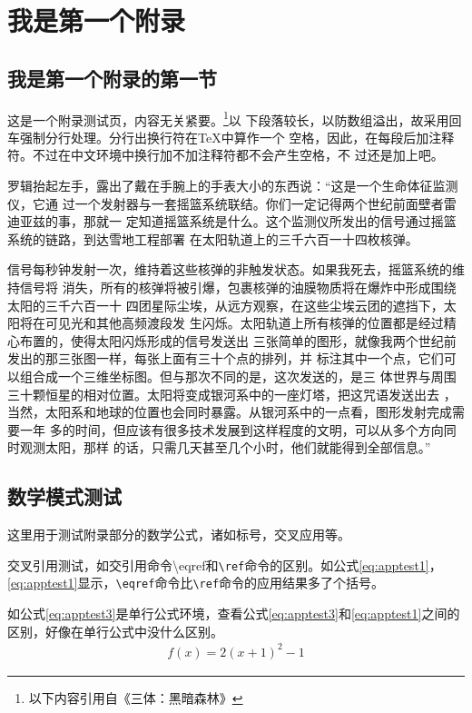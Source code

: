 \chapter{我是第一个附录}
\section{我是第一个附录的第一节}
这是一个附录测试页，内容无关紧要。\footnote{以下内容引用自《三体：黑暗森林》}以%
下段落较长，以防数组溢出，故采用回车强制分行处理。分行出换行符在\TeX 中算作一个%
空格，因此，在每段后加注释符。不过在中文环境中换行加不加注释符都不会产生空格，不%
过还是加上吧。

罗辑抬起左手，露出了戴在手腕上的手表大小的东西说：“这是一个生命体征监测仪，它通%
过一个发射器与一套摇篮系统联结。你们一定记得两个世纪前面壁者雷迪亚兹的事，那就一%
定知道摇篮系统是什么。这个监测仪所发出的信号通过摇篮系统的链路，到达雪地工程部署%
在太阳轨道上的三千六百一十四枚核弹。

信号每秒钟发射一次，维持着这些核弹的非触发状态。如果我死去，摇篮系统的维持信号将%
消失，所有的核弹将被引爆，包裹核弹的油膜物质将在爆炸中形成围绕太阳的三千六百一十%
四团星际尘埃，从远方观察，在这些尘埃云团的遮挡下，太阳将在可见光和其他高频渡段发%
生闪烁。太阳轨道上所有核弹的位置都是经过精心布置的，使得太阳闪烁形成的信号发送出%
三张简单的图形，就像我两个世纪前发出的那三张图一样，每张上面有三十个点的排列，并%
标注其中一个点，它们可以组合成一个三维坐标图。但与那次不同的是，这次发送的，是三%
体世界与周围三十颗恒星的相对位置。太阳将变成银河系中的一座灯塔，把这咒语发送出去%
，当然，太阳系和地球的位置也会同时暴露。从银河系中的一点看，图形发射完成需要一年%
多的时间，但应该有很多技术发展到这样程度的文明，可以从多个方向同时观测太阳，那样%
的话，只需几天甚至几个小时，他们就能得到全部信息。”

\section{数学模式测试}
这里用于测试附录部分的数学公式，诸如标号，交叉应用等。

交叉引用测试，如交引用命令{\ttfamily \textbackslash eqref}和\texttt{\textbackslash ref}命令的区别。如公式\eqref{eq:apptest1}，\autoref{eq:apptest1}显示，\texttt{\textbackslash eqref}命令比\texttt{\textbackslash ref}命令的应用结果多了个括号。

如公式\eqref{eq:apptest3}是单行公式环境，查看公式\eqref{eq:apptest3}和\eqref{eq:apptest1}之间的区别，好像在单行公式中没什么区别。
\begin{align}\label{eq:apptest3}
	f(x) = 2(x + 1)^{2} - 1
\end{align}

